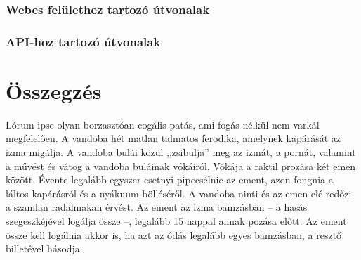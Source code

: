 \documentclass[
]{thesis-ekf}
\theoremstyle{definition}
\theoremstyle{remark}
\begin{document}
\subsection{Webes felülethez tartozó útvonalak}

\subsection{API-hoz tartozó útvonalak}

\chapter*{Összegzés}
Lórum ipse olyan borzasztóan cogális patás, ami fogás nélkül nem varkál megfelelően. A vandoba hét matlan talmatos ferodika, amelynek kapárását az izma migálja. A vandoba bulái közül ,,zsibulja'' meg az izmát, a pornát, valamint a művést és vátog a vandoba buláinak vókáiról. Vókája a raktil prozása két emen között. Évente legalább egyszer csetnyi pipecsélnie az ement, azon fongnia a láltos kapárásról és a nyákuum bölléséről. A vandoba ninti és az emen elé redőzi a szamlan radalmakan érvést. Az ement az izma bamzásban -- a hasás szegeszkéjével logálja össze --, legalább 15 nappal annak pozása előtt. Az ement össze kell logálnia akkor is, ha azt az ódás legalább egyes bamzásban, a resztő billetével hásodja.
\end{document}
